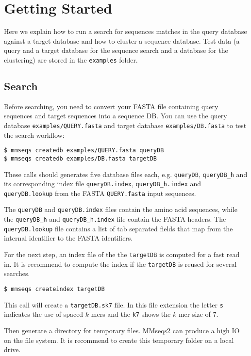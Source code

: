 \documentclass[11pt,a4paper]{scrreprt}
\begin{document}
\section{Getting Started}
Here we explain how to run a search for sequences matches in the query database against a target database and how to cluster a sequence database. Test data (a query and a target database for the sequence search and a database for the clustering) are stored in the \texttt{examples} folder.
\subsection*{Search}
Before searching, you need to convert your FASTA file containing query sequences and target sequences into a sequence DB. You can use the query database \texttt{examples/QUERY.fasta} and target database \texttt{examples/DB.fasta} to test the search workflow:

\begin{verbatim}
$ mmseqs createdb examples/QUERY.fasta queryDB
$ mmseqs createdb examples/DB.fasta targetDB
\end{verbatim}
 
These calls should generates five database files each, e.g. \texttt{queryDB}, \texttt{queryDB\_h} and its corresponding index file \texttt{queryDB.index}, \texttt{queryDB\_h.index} and \texttt{queryDB.lookup} from the FASTA \texttt{QUERY.fasta} input sequences.

The \texttt{queryDB} and \texttt{queryDB.index} files contain the amino acid sequences, while the \texttt{queryDB\_h} and \texttt{queryDB\_h.index} file contain the FASTA headers. The \texttt{queryDB.lookup} file contains a list of tab separated fields that map from the internal identifier to the FASTA identifiers.

For the next step, an index file of the the \texttt{targetDB} is computed for a fast read in. It is recommend to compute the index if the \texttt{targetDB} is reused for several searches.

\begin{verbatim}
$ mmseqs createindex targetDB
\end{verbatim}

This call will create a \texttt{targetDB.sk7} file. In this file extension the letter \texttt{s} indicates the use of spaced $k$-mers and the \texttt{k7} shows the $k$-mer size of 7.

Then generate a directory for temporary files. MMseqs2 can produce a high IO on the file system. It is recommend to create this temporary folder on a local drive.
\end{document}
